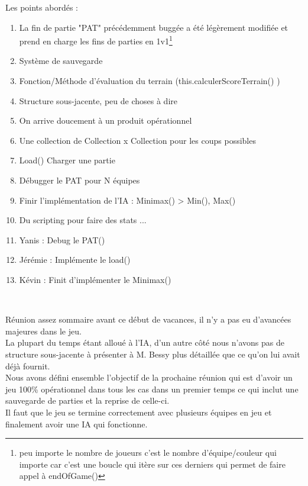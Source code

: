 \documentclass[11pt,a4paper]{article}
\begin{document}
Les points abordés :
\begin{enumerate}
    \item La fin de partie "PAT" précédemment buggée a été légèrement modifiée et prend en charge les fins de parties en 1v1\footnote{peu importe le nombre de joueurs c'est le nombre d'équipe/couleur qui importe car c'est une boucle qui itère sur ces derniers qui permet de faire appel à endOfGame() }
    \item Système de sauvegarde
    \item Fonction/Méthode d'évaluation du terrain (this.calculerScoreTerrain() )
    \item Structure sous-jacente, peu de choses à dire
    \item On arrive doucement à un produit opérationnel
    \item Une collection de Collection x Collection pour les coups possibles
    \item Load() Charger une partie
    \item Débugger le PAT pour N équipes
    \item Finir l'implémentation de l'IA : Minimax() > Min(), Max()
    \item Du scripting pour faire des stats ...
    \item Yanis : Debug le PAT()
    \item Jérémie : Implémente le load()
    \item Kévin : Finit d'implémenter le Minimax()
\end{enumerate}

\begin{tabular}{c}
    \hline
\end{tabular}
\\
    Réunion assez sommaire avant ce début de vacances, il n'y a pas eu d'avancées majeures dans le jeu. \\ 
    La plupart du temps étant alloué à l'IA, d'un autre côté nous n'avons pas de structure sous-jacente à présenter à M. Bessy plus détaillée que ce qu'on lui avait déjà fournit. \\
    Nous avons défini ensemble l'objectif de la prochaine réunion qui est d'avoir un jeu 100\% opérationnel dans tous les cas dans un premier temps ce qui inclut une sauvegarde de parties et la reprise de celle-ci.\\
    Il faut que le jeu se termine correctement avec plusieurs équipes en jeu et finalement avoir une IA qui fonctionne. \\
    
\end{document}
